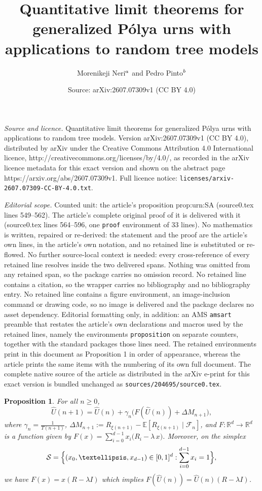 \documentclass[10pt,a4paper]{amsart}
\title{Quantitative limit theorems for generalized P\'olya urns with applications to random tree models}
\author{Morenikeji Neri${}^{\MakeLowercase a}$ and Pedro Pinto${}^{\MakeLowercase b}$}
\date{Source: arXiv:2607.07309v1 (CC BY 4.0)}
\newtheorem{proposition}{Proposition}
\newcommand{\RR}{\mathbb{R}}
\begin{document}
\maketitle

\noindent\emph{Source and licence.} Quantitative limit theorems for generalized P\'olya urns with applications to random tree models. Version arXiv:2607.07309v1 (CC BY 4.0), distributed by arXiv under the Creative Commons Attribution 4.0 International licence, http://creativecommons.org/licenses/by/4.0/, as recorded in the arXiv licence metadata for this exact version and shown on the abstract page https://arxiv.org/abs/2607.07309v1. Full licence notice: \texttt{licenses/arxiv-2607.07309-CC-BY-4.0.txt}.\par\smallskip

\noindent\textit{Editorial scope.} Counted unit: the article's proposition prop:urn:SA (source0.tex lines 549--562). The article's complete original proof of it is delivered with it (source0.tex lines 564--596, one \texttt{proof} environment of 33 lines). No mathematics is written, repaired or re-derived: the statement and the proof are the article's own lines, in the article's own notation, and no retained line is substituted or re-flowed.  No further source-local context is needed: every cross-reference of every retained line resolves inside the two delivered spans.  Nothing was omitted from any retained span, so the package carries no omission record.  No retained line contains a citation, so the wrapper carries no bibliography and no bibliography entry.  No retained line contains a figure environment, an image-inclusion command or drawing code, so no image is delivered and the package declares no asset dependency.  Editorial formatting only, in addition: an AMS \texttt{amsart} preamble that restates the article's own declarations and macros used by the retained lines, namely the environments \texttt{proposition} on separate counters, together with the standard packages those lines need.  The retained environments print in this document as Proposition 1 in order of appearance, whereas the article prints the same items with the numbering of its own full document.  The complete native source of the article as distributed in the arXiv e-print for this exact version is bundled unchanged as \texttt{sources/204695/source0.tex}.
\begin{proposition}\label{prop:urn:SA}
For all $n \geq 0$,
\[
    \hat{U}(n+1) = \hat{U}(n) + \gamma_n\bigl(F(\hat{U}(n)) + \Delta M_{n+1}\bigr),
\]
where $\gamma_n = \frac{1}{T(n+1)}$, $ \Delta M_{n+1}
    := R_{\xi(n+1)} 
      - \mathbb{E}\left[R_{\xi(n+1)} \mid \mathcal{F}_n\right]$, and  $F: \RR^d \to \RR^d$ is a function given by $F(x) = \sum_{i=0}^{d-1} x_i\bigl(R_i - \lambda\, x\bigr)$. Moreover, on the simplex
\[
    \mathcal{S} = \Bigl\{(x_0, \ldots, x_{d-1}) \in [0,1]^d : \sum_{i=0}^{d-1} x_i = 1\Bigr\},
\]
we have $F(x)= x(R-\lambda I)$ which implies $F(\hat{U}(n)) = \hat{U}(n)(R-\lambda I)$.

\end{proposition}
\end{document}
